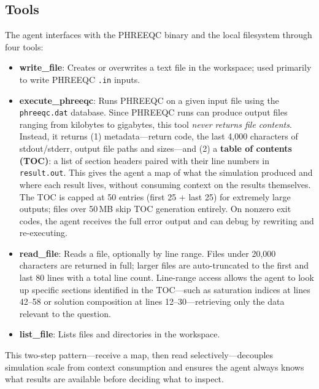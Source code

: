 \documentclass[sigconf,anonymous]{acmart}
\begin{document}
\subsection{Tools}
The agent interfaces with the PHREEQC binary and the local filesystem through four tools:
\begin{itemize}[leftmargin=*, itemsep=2pt]
  \item \textbf{write\_file}: Creates or overwrites a text file in the workspace; used primarily to write PHREEQC \texttt{.in} inputs.
  \item \textbf{execute\_phreeqc}: Runs PHREEQC on a given input file using the \texttt{phreeqc.dat} database. Since PHREEQC runs can produce output files ranging from kilobytes to gigabytes, this tool \emph{never returns file contents}. Instead, it returns (1) metadata---return code, the last 4{,}000 characters of stdout/stderr, output file paths and sizes---and (2) a \textbf{table of contents (TOC)}: a list of section headers paired with their line numbers in \texttt{result.out}. This gives the agent a map of what the simulation produced and where each result lives, without consuming context on the results themselves. The TOC is capped at 50 entries (first 25 + last 25) for extremely large outputs; files over 50\,MB skip TOC generation entirely. On nonzero exit codes, the agent receives the full error output and can debug by rewriting and re-executing.
  \item \textbf{read\_file}: Reads a file, optionally by line range. Files under 20{,}000 characters are returned in full; larger files are auto-truncated to the first and last 80 lines with a total line count. Line-range access allows the agent to look up specific sections identified in the TOC---such as saturation indices at lines 42--58 or solution composition at lines 12--30---retrieving only the data relevant to the question.
  \item \textbf{list\_file}: Lists files and directories in the workspace.
\end{itemize}

This two-step pattern---receive a map, then read selectively---decouples simulation scale from context consumption and ensures the agent always knows what results are available before deciding what to inspect.
\end{document}
